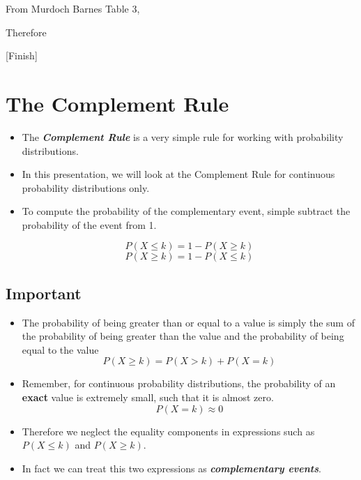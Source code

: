 \documentclass[]{report}
\begin{document}
	
	
	From Murdoch Barnes Table 3, 
	
	
	
	
	Therefore 
	
	
	[Finish] 
	
	
	
	
	
	
	
	
	\section{The Complement Rule}
	
	\begin{itemize}
		\item The \textbf{\textit{Complement Rule}} is a very simple rule for working with probability distributions.
		\item In this presentation, we will look at the Complement Rule for continuous probability distributions only.
		
	\end{itemize}
	\begin{itemize}
		
		\item To compute the probability of the complementary event, simple subtract the probability of the event from 1.
		
		\[P(X \leq k) = 1- P(X \geq k) \]
		\[P(X \geq k) = 1- P(X \leq k) \]
	\end{itemize}	
	
	
	
	\begin{framed}
		\subsection{Important}
		\begin{itemize}
			
			
			\item The probability of being greater than or equal to a value is simply the sum of the probability of being greater than the value and the probability of being equal to the value
			\[  P(X \geq k)  = P( X > k) + P(X = k) \]
			\item Remember, for continuous probability distributions, the probability of an \textbf{exact} value is extremely small, such that it is almost zero.
			\[P(X = k) \approx 0\]
			\item Therefore we neglect the equality components in expressions such as
			$P(X \leq k)$ and $P(X \geq k)$.
			\item In fact we can treat this two expressions as \textbf{\textit{complementary events}}.
		\end{itemize}
	\end{framed}
	
\end{document}
